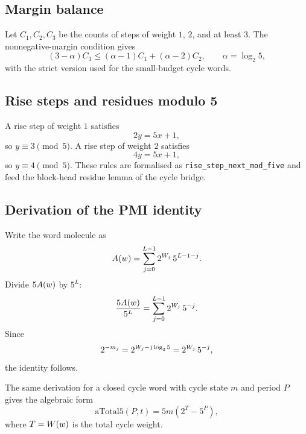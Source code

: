 \subsection{Margin balance}

Let $C_1,C_2,C_3$ be the counts of steps of weight $1$, $2$, and at
least $3$.  The nonnegative-margin condition gives
\begin{equation*}
  (3-\alpha)C_3\le(\alpha-1)C_1+(\alpha-2)C_2,
\qquad \alpha=\log_2 5,
\end{equation*}
with the strict version used for the small-budget cycle words.

\subsection{Rise steps and residues modulo 5}

A rise step of weight $1$ satisfies
\begin{equation*}
  2y=5x+1,
\end{equation*}
so $y\equiv3\pmod5$.  A rise step of weight $2$ satisfies
\begin{equation*}
  4y=5x+1,
\end{equation*}
so $y\equiv4\pmod5$.  These rules are formalised as
\texttt{rise\_step\_next\_mod\_five} and feed the block-head residue
lemma of the cycle bridge.

\subsection{Derivation of the PMI identity}

Write the word molecule as
\begin{equation*}
  A(w)=\sum_{j=0}^{L-1}2^{W_j}\,5^{L-1-j}.
\end{equation*}
Divide $5A(w)$ by $5^L$:
\begin{equation*}
  \frac{5A(w)}{5^L}
    =\sum_{j=0}^{L-1}2^{W_j}\,5^{-j}.
\end{equation*}
Since
\begin{equation*}
  2^{-m_j}=2^{W_j-j\log_2 5}
    =2^{W_j}\,5^{-j},
\end{equation*}
the identity follows.

The same derivation for a closed cycle word with cycle state $m$ and
period $P$ gives the algebraic form
\begin{equation*}
  \mathrm{aTotal5}(P,t)=5m(2^T-5^P),
\end{equation*}
where $T=W(w)$ is the total cycle weight.

